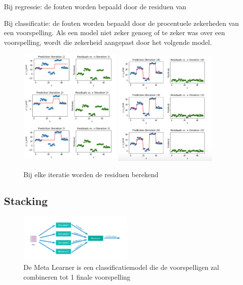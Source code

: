 \documentclass{article}
\begin{document}
Bij regressie: de fouten worden bepaald door de residuen van 

Bij classificatie: de fouten worden bepaald door de procentuele zekerheden van een voorspelling. Als een model niet zeker genoeg of te zeker was over een voorspelling, wordt die zekerheid aangepast door het volgende model.

\begin{figure}[H]
    \centering
    \includegraphics[width=0.45\textwidth]{gradient-boosting2.png}
    \includegraphics[width=0.45\textwidth]{gradient-boosting3.png}
    \caption{Bij elke iteratie worden de residuen berekend}
\end{figure}

\subsection{Stacking}

\begin{figure}[H]
    \centering
    \includegraphics[width=0.5\textwidth]{stacking.png}
    \caption{De Meta Learner is een classificatiemodel die de voorspelligen zal combineren tot 1 finale voorspelling}
\end{figure}
\end{document}

